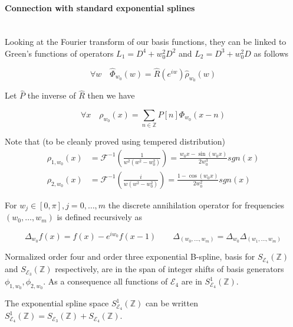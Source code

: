 \documentclass[a4paper, 11pt]{article}
\begin{document}
\paragraph{Connection with standard exponential splines} \mbox{} \\

Looking at the Fourier transform of our basis functions, they can be linked to Green's functions of operators $L_1 = D^4 
+ w_0^2 D^2$ and $L_2 = D^3 + w_0^2 D$ as follows

\begin{equation}
  \forall w \quad \hat{\Phi}_{w_0}(w) = \hat{R}(e^{iw}) \hat{\rho}_{w_0}(w)
\end{equation}

Let $\hat{P}$ the inverse of $\hat{R}$ then we have 

\begin{equation}
  \forall x \quad \rho_{w_0}(x) = \sum_{n \in \mathbb{Z}} P[n] \Phi_{w_0}(x-n)
\end{equation}

Note that (to be cleanly proved using tempered distribution)
\begin{align*}
  \rho_{1,w_0}(x)&=\mathcal{F}^{-1} \left(\frac{1}{w^2(w^2-w_0^2)}\right) = \frac{w_0x - \sin (w_0x)}{2 w_0^3} sgn(x) \\
  \rho_{2,w_0}(x)&=\mathcal{F}^{-1} \left(\frac{i}{w(w^2-w_0^2)}\right) = \frac{1 - \cos (w_0x)}{2 w_0^2} sgn(x)
\end{align*}

\begin{deftn}{1}
  For $w_j \in [0, \pi], j=0, \ldots, m$ the discrete annihilation operator for frequencies $(w_0, \ldots, w_m)$ is 
  defined recursively as 
  
  \begin{equation}
    \Delta_{w_0} f(x) = f(x) - e^{iw_0}f(x-1) \qquad \Delta_{(w_0, \ldots, w_m)} = \Delta_{w_0} \Delta_{(w_1, \ldots, 
    w_m)}
  \end{equation}
\end{deftn}

Normalized order four and order three exponential B-spline, basis for $S_{\mathcal{E}_4}(\mathbb{Z})$ and 
$S_{\mathcal{E}_3}(\mathbb{Z})$ respectively, are in the span of integer shifts of basis generators $\phi_{1, w_0}, 
\phi_{2, w_0}$. As a consequence all functions of $\mathcal{E}_4$ are in $S^{1}_{\mathcal{E}_4}(\mathbb{Z})$.

\begin{prop}{1}
  The exponential spline space $S^{1}_{\mathcal{E}_4}(\mathbb{Z})$ can be written $S^{1}_{\mathcal{E}_4}(\mathbb{Z}) = 
  S_{\mathcal{E}_3}(\mathbb{Z}) + S_{\mathcal{E}_4}(\mathbb{Z})$.
\end{prop}
\end{document}
